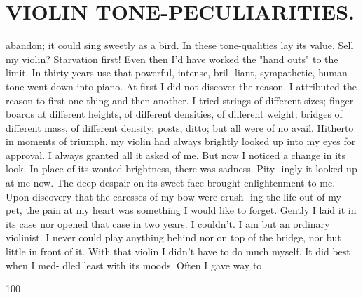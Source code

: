 \documentclass{article}
\begin{document}
\section*{VIOLIN TONE-PECULIARITIES.}
abandon; it could sing sweetly as a bird. In these tone-qualities lay its value. Sell my violin? Starvation first! Even then I'd have worked the "hand outs" to the limit. In thirty years use that powerful, intense, bril- liant, sympathetic, human tone went down into piano. At first I did not discover the reason. I attributed the reason to first one thing and then another. I tried strings of different sizes; finger boards at different heights, of different densities, of different weight; bridges of different mass, of different density; posts, ditto; but all were of no avail. Hitherto in moments of triumph, my violin had always brightly looked up into my eyes for approval. I always granted all it asked of me. But now I noticed a change in its look. In place of its wonted brightness, there was sadness. Pity- ingly it looked up at me now. The deep despair on its sweet face brought enlightenment to me. Upon discovery that the caresses of my bow were crush- ing the life out of my pet, the pain at my heart was something I would like to forget. Gently I laid it in its case nor opened that case in two years. I couldn't. I am but an ordinary violinist. I never could play anything behind nor on top of the bridge, nor but little in front of it. With that violin I didn't have to do much myself. It did best when I med- dled least with its moods. Often I gave way to

100
\end{document}

